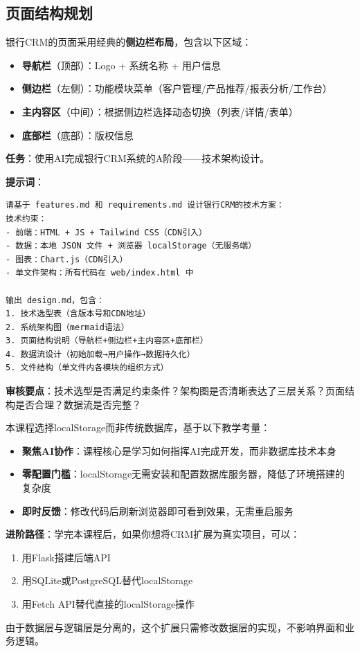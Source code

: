 \subsection{页面结构规划}

银行CRM的页面采用经典的\textbf{侧边栏布局}，包含以下区域：

\begin{itemize}[leftmargin=2em]
  \item \textbf{导航栏}（顶部）：Logo + 系统名称 + 用户信息
  \item \textbf{侧边栏}（左侧）：功能模块菜单（客户管理/产品推荐/报表分析/工作台）
  \item \textbf{主内容区}（中间）：根据侧边栏选择动态切换（列表/详情/表单）
  \item \textbf{底部栏}（底部）：版权信息
\end{itemize}

\begin{practicebox}[用AI生成设计文档]
\textbf{任务}：使用AI完成银行CRM系统的A阶段——技术架构设计。

\textbf{提示词}：

\begin{lstlisting}
请基于 features.md 和 requirements.md 设计银行CRM的技术方案：
技术约束：
- 前端：HTML + JS + Tailwind CSS（CDN引入）
- 数据：本地 JSON 文件 + 浏览器 localStorage（无服务端）
- 图表：Chart.js（CDN引入）
- 单文件架构：所有代码在 web/index.html 中

输出 design.md，包含：
1. 技术选型表（含版本号和CDN地址）
2. 系统架构图（mermaid语法）
3. 页面结构说明（导航栏+侧边栏+主内容区+底部栏）
4. 数据流设计（初始加载→用户操作→数据持久化）
5. 文件结构（单文件内各模块的组织方式）
\end{lstlisting}

\textbf{审核要点}：技术选型是否满足约束条件？架构图是否清晰表达了三层关系？页面结构是否合理？数据流是否完整？
\end{practicebox}

\begin{notebox}[为什么本课程不用数据库]
本课程选择localStorage而非传统数据库，基于以下教学考量：
\begin{itemize}[leftmargin=2em]
  \item \textbf{聚焦AI协作}：课程核心是学习如何指挥AI完成开发，而非数据库技术本身
  \item \textbf{零配置门槛}：localStorage无需安装和配置数据库服务器，降低了环境搭建的复杂度
  \item \textbf{即时反馈}：修改代码后刷新浏览器即可看到效果，无需重启服务
\end{itemize}
\textbf{进阶路径}：学完本课程后，如果你想将CRM扩展为真实项目，可以：
\begin{enumerate}[leftmargin=2em]
  \item 用Flask搭建后端API
  \item 用SQLite或PostgreSQL替代localStorage
  \item 用Fetch API替代直接的localStorage操作
\end{enumerate}
由于数据层与逻辑层是分离的，这个扩展只需修改数据层的实现，不影响界面和业务逻辑。
\end{notebox}

